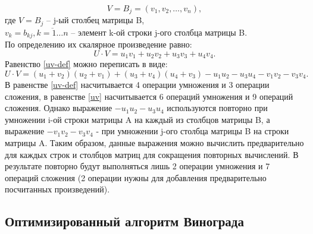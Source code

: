 \documentclass[12pt]{report}
\begin{document}
	\begin{equation}
	\label{v-def}
	V = B_{j} = (v_{1}, v_{2}, \ldots, v_{n}),
	\end{equation}
	где $V = B_{j}$ -- j-ый столбец матрицы B,\\
	$v_{k} = b_{kj}, \overline{k = 1 \ldots n}$ -- элемент k-ой строки j-ого столбца матрицы B.\\
	
	По определению их скалярное произведение равно:\\
	\begin{equation}
	\label{uv-def}
	U \cdot V = u_{1}v_{1} + u_{2}v_{2} + u_{3}v_{3} + u_{4}v_{4}.
	\end{equation}
	Равенство \ref{uv-def} можно переписать в виде:\\
	\begin{equation}
	\label{uv}
	U \cdot V = (u_{1} + v_{2})(u_{2} + v_{1}) + (u_{3} + v_{4})(u_{4} + v_{3}) - u_{1}u_{2} - u_{3}u_{4} - v_{1}v_{2} - v_{3}v_{4}.
	\end{equation}
	В равенстве \ref{uv-def} насчитывается 4 операции умножения и 3 операции сложения, в равенстве \ref{uv} насчитывается 6 операций умножения и 9 операций сложения. Однако выражение $- u_{1}u_{2} - u_{3}u_{4}$ используются повторно при умножении i-ой строки матрицы A на каждый из столбцов матрицы B, а выражение $- v_{1}v_{2} - v_{3}v_{4}$ - при умножении j-ого столбца матрицы B на строки матрицы A. Таким образом, данные выражения можно вычислить предварительно для каждых строк и столбцов матриц для сокращения повторных вычислений. В результате повторно будут выполняться лишь 2 операции умножения и 7 операций сложения (2 операции нужны для добавления предварительно посчитанных произведений).
	
	\subsection{Оптимизированный алгоритм Винограда}\label{optymize}
	
	~\
	
\end{document}
